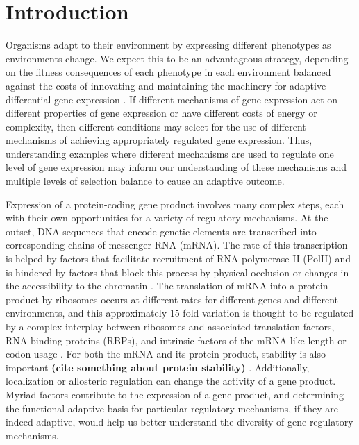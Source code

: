 \chapter{Introduction}

Organisms adapt to
their environment by expressing different phenotypes as environments
change. We expect this to be an advantageous strategy, depending on
the fitness consequences of each phenotype in each
environment balanced against the costs of innovating and maintaining
the machinery for adaptive differential gene expression
\parencite{kussell2005phenotypic}. 
If different mechanisms of gene expression act on different properties
of gene expression or have different costs of energy or complexity, 
then different conditions may select
for the use of different mechanisms of achieving appropriately
regulated gene expression.
Thus, understanding examples where different mechanisms are used to
regulate one level of gene expression may inform our understanding 
of these mechanisms and multiple levels of selection balance to cause
an adaptive outcome.

Expression of a protein-coding gene
product involves many complex steps, each with their own opportunities
for a variety of regulatory mechanisms. At the outset, DNA sequences
that encode genetic elements are transcribed into corresponding chains
of messenger RNA (mRNA). The rate of this transcription is helped by
factors that facilitate recruitment of RNA polymerase II (PolII)
and is hindered by factors that block this process by physical
occlusion or changes in the accessibility to the chromatin 
\parencite{hahn2011transcriptional}. 
The translation of mRNA into a protein product by
ribosomes occurs at different rates for different genes and different
environments, and this approximately 15-fold variation 
\parencite{weinberg2016improved} is thought to be 
regulated by a complex interplay between ribosomes and
associated translation factors, RNA binding proteins (RBPs), and
intrinsic factors of the mRNA like length or codon-usage 
\parencite{dever2016mechanism}.
For both the mRNA and its protein product, stability is also
important 
\textbf{(cite something about protein stability)} 
\parencite{perez2013eukaryotic}. 
Additionally, localization or allosteric regulation can change
the activity of a gene product. Myriad factors contribute to the
expression of a gene product, and determining the functional adaptive
basis for particular regulatory mechanisms, if they are indeed
adaptive, would help us better understand the diversity of gene
regulatory mechanisms.

